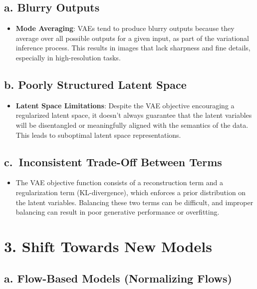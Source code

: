 \documentclass[
]{book}
\providecommand{\tightlist}{%
  \setlength{\itemsep}{0pt}\setlength{\parskip}{0pt}}
\begin{document}
\subsection{a. Blurry Outputs}\label{a.-blurry-outputs}

\begin{itemize}
\tightlist
\item
  \textbf{Mode Averaging}: VAEs tend to produce blurry outputs because they average over all possible outputs for a given input, as part of the variational inference process. This results in images that lack sharpness and fine details, especially in high-resolution tasks.
\end{itemize}

\subsection{b. Poorly Structured Latent Space}\label{b.-poorly-structured-latent-space}

\begin{itemize}
\tightlist
\item
  \textbf{Latent Space Limitations}: Despite the VAE objective encouraging a regularized latent space, it doesn't always guarantee that the latent variables will be disentangled or meaningfully aligned with the semantics of the data. This leads to suboptimal latent space representations.
\end{itemize}

\subsection{c.~Inconsistent Trade-Off Between Terms}\label{c.-inconsistent-trade-off-between-terms}

\begin{itemize}
\tightlist
\item
  The VAE objective function consists of a reconstruction term and a regularization term (KL-divergence), which enforces a prior distribution on the latent variables. Balancing these two terms can be difficult, and improper balancing can result in poor generative performance or overfitting.
\end{itemize}

\section{3. Shift Towards New Models}\label{shift-towards-new-models}

\subsection{a. Flow-Based Models (Normalizing Flows)}\label{a.-flow-based-models-normalizing-flows}
\end{document}
